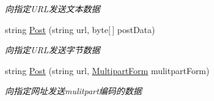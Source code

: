 \begin{DoxyCompactItemize}
\begin{DoxyCompactList}\small\item\em 向指定\-U\-R\-L发送文本数据 \end{DoxyCompactList}\item 
string \hyperlink{class_x_c_l_net_tools_1_1_file_handler_1_1_web_client_ad799cba2f787fba4c0ca4fc6e86ee831}{Post} (string url, byte\mbox{[}$\,$\mbox{]} post\-Data)
\begin{DoxyCompactList}\small\item\em 向指定\-U\-R\-L发送字节数据 \end{DoxyCompactList}\item 
string \hyperlink{class_x_c_l_net_tools_1_1_file_handler_1_1_web_client_ab1556a7a601a8425c7d6bcecb09d6cf2}{Post} (string url, \hyperlink{class_x_c_l_net_tools_1_1_file_handler_1_1_multipart_form}{Multipart\-Form} mulitpart\-Form)
\begin{DoxyCompactList}\small\item\em 向指定网址发送mulitpart编码的数据 \end{DoxyCompactList}\end{DoxyCompactItemize}
